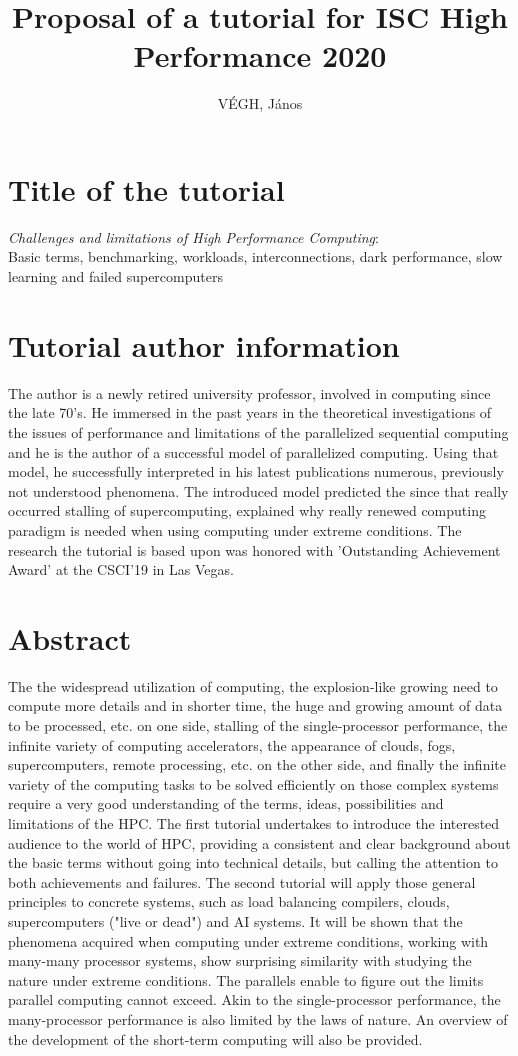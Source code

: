 \documentclass[preprint,12pt,authoryear]{article}
\begin{document}
	\title{Proposal of a tutorial for ISC High Performance 2020}
	\author{V\'EGH, J\'anos}
	\maketitle
	\section{Title of the tutorial}
	\textit{Challenges and limitations	of High Performance Computing}:\\ 
Basic terms, benchmarking,
workloads, interconnections, dark performance, slow learning and failed supercomputers
\section{Tutorial author information}
The author is a newly retired university professor, involved in computing
since the late 70's. He immersed in the past years in the theoretical investigations of the issues of 
performance and limitations of the parallelized sequential computing
and he is the author of a successful model of parallelized computing.
Using that model, he successfully interpreted in his latest publications numerous, previously not understood phenomena.
The introduced model predicted the since that really occurred stalling of supercomputing, explained why really renewed computing paradigm
is needed when using computing under extreme conditions.
The research the tutorial is based upon was honored with 'Outstanding 
Achievement Award' at the CSCI'19 in Las Vegas.

\section{Abstract}
The  the widespread
utilization of computing, the explosion-like growing need to compute more details and in shorter time,
the huge and growing amount of data to be processed, etc. on one side,
stalling of the single-processor performance, the infinite variety of  computing accelerators, the appearance of clouds, fogs, supercomputers,
remote processing, etc. on the other side, and finally the infinite variety of the
computing tasks to be solved efficiently on those complex systems require a very good understanding of
the terms, ideas, possibilities  and limitations of the HPC.
The first tutorial undertakes to introduce the interested audience
to the world of HPC, 
providing a consistent and clear background about the basic terms
without going into technical details,
but calling the attention to both achievements and failures.
The second tutorial will apply those 
general principles to concrete systems, such as load balancing compilers, clouds, supercomputers 
("live or dead") and AI systems. It will be shown that the phenomena  acquired when
computing under extreme conditions, working with many-many processor systems, 
show surprising similarity with studying the nature under extreme conditions.
The parallels enable to figure out the limits parallel computing cannot exceed.
Akin to the single-processor performance, the many-processor performance is also limited by the laws of nature.
An overview of the development of the short-term computing will also be provided.
 
\end{document}
